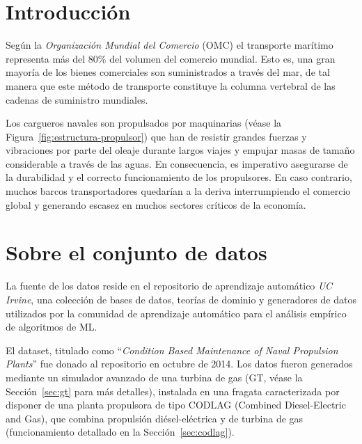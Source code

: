 \documentclass[a4paper]{article}
\begin{document}
\tableofcontents
\thispagestyle{empty}
\clearpage
{}
\hypersetup{pageanchor=true}


\section{Introducción}
  Según la \textit{Organización Mundial del Comercio} (OMC) el transporte marítimo representa más del 80\% del volumen del comercio mundial. Esto es, una gran mayoría de los bienes comerciales son suministrados a través del mar, de tal manera que este método de transporte constituye la columna vertebral de las cadenas de suministro mundiales.~\cite{wto_maritime_transport_services}
  
  Los cargueros navales son propulsados por maquinarias (véase la Figura~\ref{fig:estructura-propulsor}) que han de resistir grandes fuerzas y vibraciones por parte del oleaje durante largos viajes y empujar masas de tamaño considerable a través de las aguas. En consecuencia, es imperativo asegurarse de la durabilidad y el correcto funcionamiento de los propulsores. En caso contrario, muchos barcos transportadores quedarían a la deriva interrumpiendo el comercio global y generando escasez en muchos sectores críticos de la economía.

\section{Sobre el conjunto de datos}
  La fuente de los datos reside en el repositorio de aprendizaje automático \textit{UC Irvine}, una colección de bases de datos, teorías de dominio y generadores de datos utilizados por la comunidad de aprendizaje automático para el análisis empírico de algoritmos de ML.~\cite{kelly2023uci}

  El dataset, titulado como ``\textit{Condition Based Maintenance of Naval Propulsion Plants}'' fue donado al repositorio en octubre de 2014. Los datos fueron generados mediante un simulador avanzado de una turbina de gas (GT, véase la Sección~\ref{sec:gt} para más detalles), instalada en una fragata caracterizada por disponer de una planta propulsora de tipo CODLAG (Combined Diesel-Electric and Gas), que combina propulsión diésel-eléctrica y de turbina de gas (funcionamiento detallado en la Sección~\ref{sec:codlag}).~\cite{condition_based_maintenance_of_naval_propulsion_plants_316}
\end{document}
